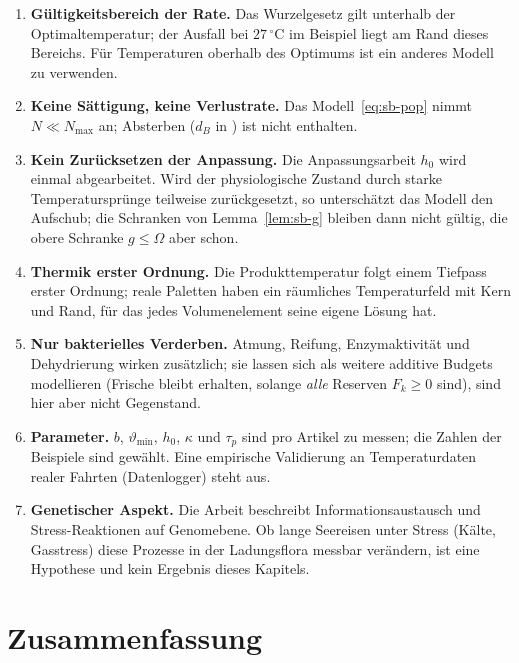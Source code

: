 \documentclass[a4paper, 12pt, twoside, openright]{report}
\theoremstyle{definition}
\theoremstyle{definition}
\begin{document}
\begin{enumerate}
  \item \textbf{Gültigkeitsbereich der Rate.} Das Wurzelgesetz gilt unterhalb der
    Optimaltemperatur; der Ausfall bei $27\,{}^\circ$C im Beispiel liegt am Rand dieses Bereichs.
    Für Temperaturen oberhalb des Optimums ist ein anderes Modell zu verwenden.
  \item \textbf{Keine Sättigung, keine Verlustrate.} Das Modell~\eqref{eq:sb-pop} nimmt
    $N\ll N_{\max}$ an; Absterben ($d_B$ in \cite{epp_bgies}) ist nicht enthalten.
  \item \textbf{Kein Zurücksetzen der Anpassung.} Die Anpassungsarbeit $h_0$ wird einmal
    abgearbeitet. Wird der physiologische Zustand durch starke Temperatursprünge teilweise
    zurückgesetzt, so unterschätzt das Modell den Aufschub; die Schranken von
    Lemma~\ref{lem:sb-g} bleiben dann nicht gültig, die obere Schranke $g\le\Omega$ aber schon.
  \item \textbf{Thermik erster Ordnung.} Die Produkttemperatur folgt einem Tiefpass erster
    Ordnung; reale Paletten haben ein räumliches Temperaturfeld mit Kern und Rand, für das
    jedes Volumenelement seine eigene Lösung hat.
  \item \textbf{Nur bakterielles Verderben.} Atmung, Reifung, Enzymaktivität und
    Dehydrierung wirken zusätzlich; sie lassen sich als weitere additive Budgets modellieren
    (Frische bleibt erhalten, solange \emph{alle} Reserven $F_k\ge0$ sind), sind hier aber
    nicht Gegenstand.
  \item \textbf{Parameter.} $b$, $\vartheta_{\min}$, $h_0$, $\kappa$ und $\tau_p$ sind pro
    Artikel zu messen; die Zahlen der Beispiele sind gewählt. Eine empirische Validierung an
    Temperaturdaten realer Fahrten (Datenlogger) steht aus.
  \item \textbf{Genetischer Aspekt.} Die Arbeit \cite{epp_bgies} beschreibt Informationsaustausch
    und Stress-Reaktionen auf Genomebene. Ob lange Seereisen unter Stress (Kälte, Gasstress) diese Prozesse in der
    Ladungsflora messbar verändern, ist eine Hypothese und kein Ergebnis dieses Kapitels.
\end{enumerate}

\section{Zusammenfassung}
\end{document}
